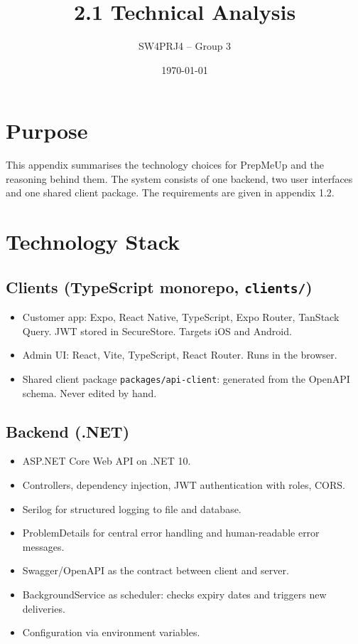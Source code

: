 \documentclass[a4paper,11pt]{article}
\title{2.1 Technical Analysis}
\author{SW4PRJ4 -- Group 3}
\date{\today}
\begin{document}
\maketitle

\section{Purpose}
This appendix summarises the technology choices for PrepMeUp and the reasoning behind them. The system consists of one backend, two user interfaces and one shared client package. The requirements are given in appendix 1.2.

\section{Technology Stack}

\subsection{Clients (TypeScript monorepo, \texttt{clients/})}
\begin{itemize}
    \item Customer app: Expo, React Native, TypeScript, Expo Router, TanStack Query. JWT stored in SecureStore. Targets iOS and Android.
    \item Admin UI: React, Vite, TypeScript, React Router. Runs in the browser.
    \item Shared client package \texttt{packages/api-client}: generated from the OpenAPI schema. Never edited by hand.
\end{itemize}

\subsection{Backend (.NET)}
\begin{itemize}
    \item ASP.NET Core Web API on .NET 10.
    \item Controllers, dependency injection, JWT authentication with roles, CORS.
    \item Serilog for structured logging to file and database.
    \item ProblemDetails for central error handling and human-readable error messages.
    \item Swagger/OpenAPI as the contract between client and server.
    \item BackgroundService as scheduler: checks expiry dates and triggers new deliveries.
    \item Configuration via environment variables.
\end{itemize}
\end{document}
